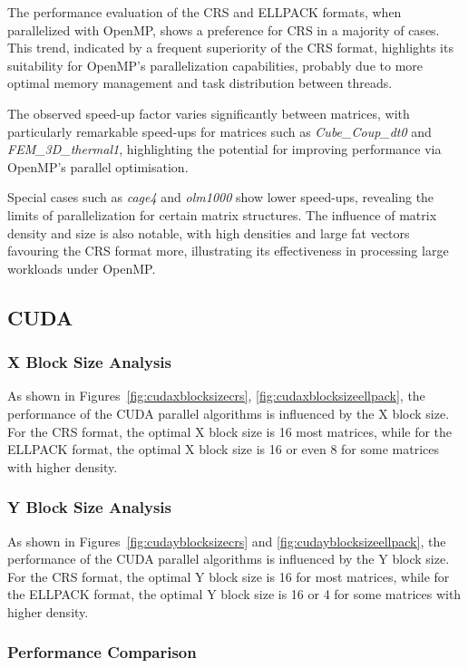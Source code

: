\documentclass[12pt,oneside]{book} %
\begin{document}
\newpage
The performance evaluation of the CRS and ELLPACK formats, when parallelized
with OpenMP, shows a preference for CRS in a majority of cases. This trend,
indicated by a frequent superiority of the CRS format, highlights its
suitability for OpenMP's parallelization capabilities, probably due to more
optimal memory management and task distribution between threads.

The observed speed-up factor varies significantly between matrices, with
particularly remarkable speed-ups for matrices such as \textit{Cube\_Coup\_dt0}
and \textit{FEM\_3D\_thermal1}, highlighting the potential for improving
performance via OpenMP's parallel optimisation.

Special cases such as \textit{cage4} and \textit{olm1000} show lower speed-ups,
revealing the limits of parallelization for certain matrix structures. The
influence of matrix density and size is also notable, with high densities and
large fat vectors favouring the CRS format more, illustrating its effectiveness
in processing large workloads under OpenMP.

\newpage
\subsection{CUDA}

\subsubsection{X Block Size Analysis}

As shown in Figures~\ref{fig:cudaxblocksizecrs},
\ref{fig:cudaxblocksizeellpack}, the performance of the CUDA parallel
algorithms is influenced by the X block size. For the CRS format, the optimal X
block size is 16 most matrices, while for the ELLPACK format, the optimal X
block size is 16 or even 8 for some matrices with higher density.

\subsubsection{Y Block Size Analysis}

As shown in Figures~\ref{fig:cudayblocksizecrs} and
\ref{fig:cudayblocksizeellpack}, the performance of the CUDA parallel
algorithms is influenced by the Y block size. For the CRS format, the optimal Y
block size is 16 for most matrices, while for the ELLPACK format, the optimal Y
block size is 16 or 4 for some matrices with higher density.

\subsubsection{Performance Comparison}
\end{document}

